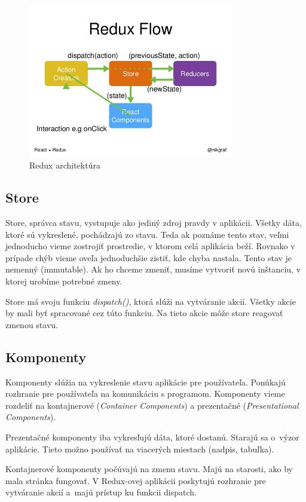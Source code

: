 \begin{figure}
  \centering
    \includegraphics[width=0.8\textwidth]{./images/redux.jpg}
  \caption{Redux architektúra \cite{ReduxObr}}\label{obr:redux}
\end{figure}

\subsection{Store}
Store, správca stavu, vystupuje ako jediný zdroj pravdy v aplikácii. Všetky dáta, ktoré sú vykreslené, pochádzajú zo stavu. Teda ak poznáme tento stav, veľmi jednoducho vieme zostrojiť prostredie, v ktorom celá aplikácia beží. Rovnako v prípade chýb vieme oveľa jednoduchšie zistiť, kde chyba nastala. Tento stav je nemenný (immutable). Ak ho chceme zmeniť, musíme vytvoriť novú inštanciu, v ktorej urobíme potrebné zmeny.

Store má svoju funkciu \emph{dispatch()}, ktorá slúži na vytváranie akcií. Všetky akcie by mali byť spracované cez túto funkciu. Na tieto akcie môže store reagovať zmenou stavu.

\subsection{Komponenty}
Komponenty slúžia na vykreslenie stavu aplikácie pre používateľa. Ponúkajú rozhranie pre používateľa na komunikáciu s programom. Komponenty vieme rozdeliť na kontajnerové (\emph{Container Components}) a prezentačné (\emph{Presentational Components}).

Prezentačné komponenty iba vykresľujú dáta, ktoré dostanú. Starajú sa o~výzor aplikácie. Tieto možno používať na viacerých miestach (nadpis, tabuľka). 

Kontajnerové komponenty počúvajú na zmenu stavu. Majú na starosti, ako by mala stránka fungovať. V Redux-ovej aplikácii poskytujú rozhranie pre vytváranie akcií a~majú prístup ku funkcii dispatch.

